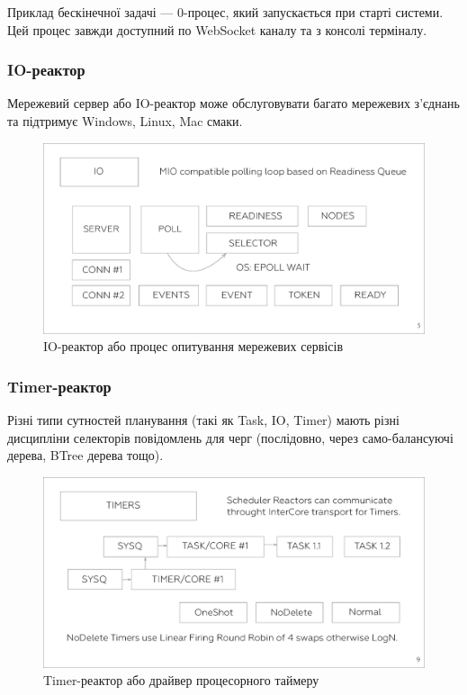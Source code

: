 Приклад бескінечної задачі --- 0-процес,
який запускається при старті системи. Цей процес завжди доступний
по WebSocket каналу та з консолі терміналу.

\subsubsection*{IO-реактор}
Мережевий сервер або IO-реактор може обслуговувати багато
мережевих з'єднань та підтримує Windows, Linux, Mac смаки.
\begin{figure}[h]
  \centerline{\includegraphics[scale=0.25]{net.eps}}
  \caption{IO-реактор або процес опитування мережевих сервісів}
\end{figure}

\subsubsection*{Timer-реактор}
Різні типи сутностей планування (такі як Task, IO, Timer)
мають різні дисципліни селекторів повідомлень для черг
(послідовно, через само-балансуючі дерева, BTree дерева тощо).
\begin{figure}[h]
  \centerline{\includegraphics[scale=0.25]{timer.eps}}
  \caption{Timer-реактор або драйвер процесорного таймеру}
\end{figure}

